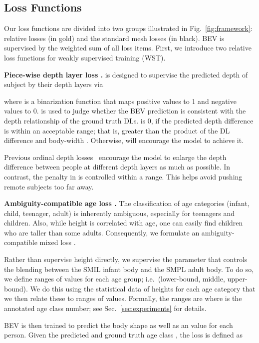 \documentclass[10pt,twocolumn,letterpaper]{article}
\begin{document}
\subsection{Loss Functions}\label{sec:loss_functions}

Our loss functions are divided into two groups illustrated in Fig.~\ref{fig:framework}: relative losses (in gold) and the standard mesh losses (in black).
BEV is supervised by the weighted sum of all loss items.
First, we introduce two relative loss functions for weakly supervised training (WST).

\textbf{Piece-wise depth layer loss .}
 is designed to supervise the predicted depth  of subject  by their depth layers  via

where  is a binarization function that maps positive values to 1 and negative values to 0.
 is used to judge whether the BEV prediction is consistent with the depth relationship of the ground truth  DLs.
 is 0, if the predicted depth difference is within an acceptable range; that is, greater than the product of the DL difference and body-width .
Otherwise,  will encourage the model to achieve it.

Previous ordinal depth losses~\cite{chen2016single,pavlakos2018ordinal} encourage the model to enlarge the depth difference between people at different depth layers as much as possible.
In contrast, the penalty in  is controlled within a  range.
This helps avoid pushing remote subjects too far away.

\textbf{Ambiguity-compatible age loss .}
The classification of age categories (infant, child, teenager, adult) is inherently ambiguous, especially for teenagers and children.
Also, while height is correlated with age, one can easily find children who are taller than some adults.
Consequently, we formulate an ambiguity-compatible mixed loss . 

Rather than supervise height directly, we supervise the  parameter that controls the blending between the SMIL infant body and the SMPL adult body.
To do so, we define ranges of  values for each age group; i.e.~(lower-bound, middle, upper-bound).
We do this using the statistical data of heights for each age category that we then relate these to ranges of  values.
Formally, the ranges are   where  is the annotated age class number; see Sec.~\ref{sec:experiments} for details.

BEV is then trained to predict the body shape as well as an  value for each person.
Given the predicted  and ground truth age class , the loss  is defined as
\end{document}
